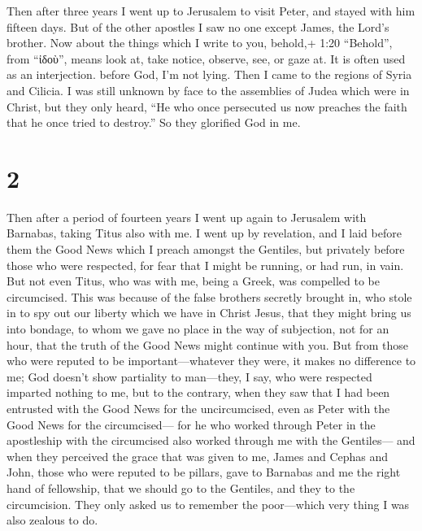  Then after three years I went up to Jerusalem to visit
Peter, and stayed with him fifteen days.  But of the other
apostles I saw no one except James, the Lord's brother. 
Now about the things which I write to you, behold,+ 1:20 ``Behold'',
from ``ἰδοὺ'', means look at, take notice, observe, see, or gaze at. It
is often used as an interjection. before God, I'm not lying.
 Then I came to the regions of Syria and Cilicia.
 I was still unknown by face to the assemblies of Judea
which were in Christ,  but they only heard, ``He who once
persecuted us now preaches the faith that he once tried to destroy.''
 So they glorified God in me.

\hypertarget{section-1}{%
\section{2}\label{section-1}}

 Then after a period of fourteen years I went up again to
Jerusalem with Barnabas, taking Titus also with me.  I went
up by revelation, and I laid before them the Good News which I preach
amongst the Gentiles, but privately before those who were respected, for
fear that I might be running, or had run, in vain.  But not
even Titus, who was with me, being a Greek, was compelled to be
circumcised.  This was because of the false brothers
secretly brought in, who stole in to spy out our liberty which we have
in Christ Jesus, that they might bring us into bondage,  to
whom we gave no place in the way of subjection, not for an hour, that
the truth of the Good News might continue with you.  But
from those who were reputed to be important---whatever they were, it
makes no difference to me; God doesn't show partiality to man---they, I
say, who were respected imparted nothing to me,  but to the
contrary, when they saw that I had been entrusted with the Good News for
the uncircumcised, even as Peter with the Good News for the
circumcised---  for he who worked through Peter in the
apostleship with the circumcised also worked through me with the
Gentiles---  and when they perceived the grace that was
given to me, James and Cephas and John, those who were reputed to be
pillars, gave to Barnabas and me the right hand of fellowship, that we
should go to the Gentiles, and they to the circumcision. 
They only asked us to remember the poor---which very thing I was also
zealous to do.

